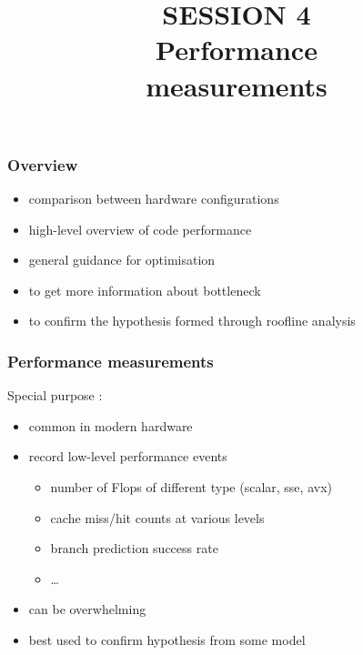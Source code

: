 \documentclass[dvipsnames,presentation,aspectratio=169,14pt]{beamer}
\date{}
\begin{document}
\title{\firasemibold\color{White}%
  {\fontsize{20}{0}\selectfont SESSION 4\\
    \fontsize{34}{34}\selectfont Performance\\measurements\par}}
\titleslide


\begin{frame}
  \frametitle{Overview}
  \begin{itemize}[itemsep=5pt]
  \item comparison between hardware configurations
  \item high-level overview of code performance
  \item general guidance for optimisation
  \end{itemize}
  \pause
  \vskip 11pt

  \begin{itemize}[itemsep=5pt]
  \item to get more information about bottleneck
  \item to confirm the hypothesis formed through roofline analysis
  \end{itemize}
\end{frame}

\begin{frame}
  \frametitle{Performance measurements}
  Special purpose :
  \begin{itemize}[itemsep=5pt]
  \item common in modern hardware
  \item record low-level performance events
    \begin{itemize}[itemsep=3pt]
    \item number of Flops of different type (scalar, sse, avx)
    \item cache miss/hit counts at various levels
    \item branch prediction success rate
    \item \ldots
    \end{itemize}
  \item<2> can be overwhelming
  \item<2> best used to confirm hypothesis from some model
  \end{itemize}
\end{frame}
\end{document}
